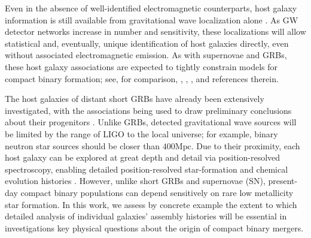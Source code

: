 \documentclass[nofootinbib,twocolumn,prd]{emulateapj}
\newcommand\editremark[1]{{\color{red}#1}}
\newcommand\unit[1]{\text{#1}}
\begin{document}
%
Even in the absence of well-identified electromagnetic counterparts, host galaxy information is still available from gravitational wave localization alone \citep{2016LRR....19....1A,2016arXiv160307333S}.  As GW detector
networks increase in number and sensitivity, these localizations will allow statistical and, eventually, unique identification of
host galaxies directly, even without associated electromagnetic emission.
%
As with supernovae and  GRBs, these host galaxy associations   are expected to tightly constrain models for compact binary
formation; see, for comparison,  \citet{2011MNRAS.412.1508M}, \citet{long-grb-GuettaPiran2007},
\citet{2014ARAA..52...43B}, and references therein. %
%

The host galaxies of distant short GRBs have already been extensively investigated, with the associations being used to
draw preliminary conclusions about their progenitors  \citep{2014ARAA..52...43B}.   
Unlike GRBs, detected gravitational wave sources will be limited by the range of LIGO to the local universe; for
example,  binary neutron star sources should be closer than $400\unit{Mpc}$.  Due to their proximity, each host galaxy
can be explored at great depth and detail via  position-resolved spectroscopy, enabling detailed position-resolved star-formation
and chemical evolution histories  \citep[see,e.g.][]{2009MNRAS.396..462K,2014MNRAS.444..336C,
CALIFA,CALIFA2}.  
%
However, unlike short GRBs and supernovae (SN), present-day compact  binary populations can depend sensitively on rare low metallicity
star formation.
In this work, we assess by concrete example the extent to which detailed analysis of individual galaxies' assembly histories will be essential in
investigations key physical questions about the origin of compact binary mergers. 
\end{document}
